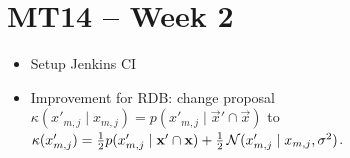 \section{MT14 -- Week 2}
\begin{itemize}
	\item Setup Jenkins CI
	\item Improvement for RDB: change proposal $\kappa(x'_{m, j} \mid x_{m, j}) = p(x'_{m, j} \mid \vec x' \cap \vec x)$ to $\kappa(x'_{m, j}) = \frac{1}{2} p(x'_{m, j} \mid \boldsymbol{\mathbf{x}}' \cap \boldsymbol{\mathbf{x}}) + \frac{1}{2} \operatorname{\mathcal N}(x'_{m, j} \mid x_{m, j}, \sigma^2)$.
\end{itemize}